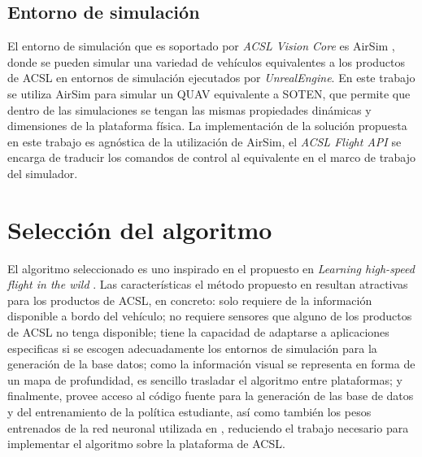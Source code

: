 \subsection{Entorno de simulación}

El entorno de simulación que es soportado por \textit{ACSL Vision Core} es AirSim \cite{shah2018airsim}, donde se pueden simular una variedad de vehículos equivalentes a los productos de ACSL en entornos de simulación ejecutados por \textit{UnrealEngine}. En este trabajo se utiliza AirSim para simular un QUAV equivalente a SOTEN, que permite que dentro de las simulaciones se tengan las mismas propiedades dinámicas y dimensiones de la plataforma física. La implementación de la solución propuesta en este trabajo es agnóstica de la utilización de AirSim, el \textit{ACSL Flight API} se encarga de traducir los comandos de control al equivalente en el marco de trabajo del simulador.

\section{Selección del algoritmo}

\label{sec:imp-algo}

El algoritmo seleccionado es uno inspirado en el propuesto en \textit{Learning high-speed flight in the wild} \cite{Loquercio2021}. Las características el método propuesto en \cite{Loquercio2021} resultan atractivas para los productos de ACSL, en concreto: solo requiere de la información disponible a bordo del vehículo; no requiere sensores que alguno de los productos de ACSL no tenga disponible; tiene la capacidad de adaptarse a aplicaciones especificas si se escogen adecuadamente los entornos de simulación para la generación de la base datos; como la información visual se representa en forma de un mapa de profundidad, es sencillo trasladar el algoritmo entre plataformas; y finalmente, \cite{Loquercio2021} provee acceso al código fuente para la generación de las base de datos y del entrenamiento de la política estudiante, así como también los pesos entrenados de la red neuronal utilizada en \cite{Loquercio2021}, reduciendo el trabajo necesario para implementar el algoritmo sobre la plataforma de ACSL.


